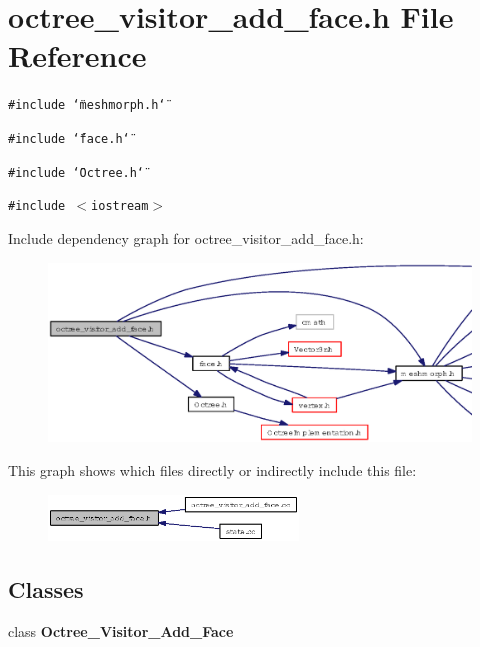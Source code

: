 \section{octree\_\-visitor\_\-add\_\-face.h File Reference}
\label{octree__visitor__add__face_8h}
{\tt \#include \char`\"{}meshmorph.h\char`\"{}}\par
{\tt \#include \char`\"{}face.h\char`\"{}}\par
{\tt \#include \char`\"{}Octree.h\char`\"{}}\par
{\tt \#include $<$iostream$>$}\par


Include dependency graph for octree\_\-visitor\_\-add\_\-face.h:\begin{figure}[H]
\begin{center}
\leavevmode
\includegraphics[width=355pt]{octree__visitor__add__face_8h__incl}
\end{center}
\end{figure}


This graph shows which files directly or indirectly include this file:\begin{figure}[H]
\begin{center}
\leavevmode
\includegraphics[width=188pt]{octree__visitor__add__face_8h__dep__incl}
\end{center}
\end{figure}
\subsection*{Classes}
\begin{CompactItemize}
\item 
class {\bf Octree\_\-Visitor\_\-Add\_\-Face}
\end{CompactItemize}
